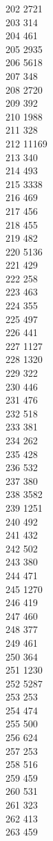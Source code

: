 { 202	2721 \\
 203	314 \\
 204	461 \\
 205	2935 \\
 206	5618 \\
 207	348 \\
 208	2720 \\
 209	392 \\
 210	1988 \\
 211	328 \\
 212	11169 \\
 213	340 \\
 214	493 \\
 215	3338 \\
 216	469 \\
 217	456 \\
 218	455 \\
 219	482 \\
 220	5136 \\
 221	429 \\
 222	258 \\
 223	463 \\
 224	355 \\
 225	497 \\
 226	441 \\
 227	1127 \\
 228	1320 \\
 229	322 \\
 230	446 \\
 231	476 \\
 232	518 \\
 233	381 \\
 234	262 \\
 235	428 \\
 236	532 \\
 237	380 \\
 238	3582 \\
 239	1251 \\
 240	492 \\
 241	432 \\
 242	502 \\
 243	380 \\
 244	471 \\
 245	1270 \\
 246	419 \\
 247	460 \\
 248	377 \\
 249	461 \\
 250	364 \\
 251	1230 \\
 252	5287 \\
 253	253 \\
 254	474 \\
 255	500 \\
 256	624 \\
 257	253 \\
 258	516 \\
 259	459 \\
 260	531 \\
 261	323 \\
 262	413 \\
 263	459 \\
}
